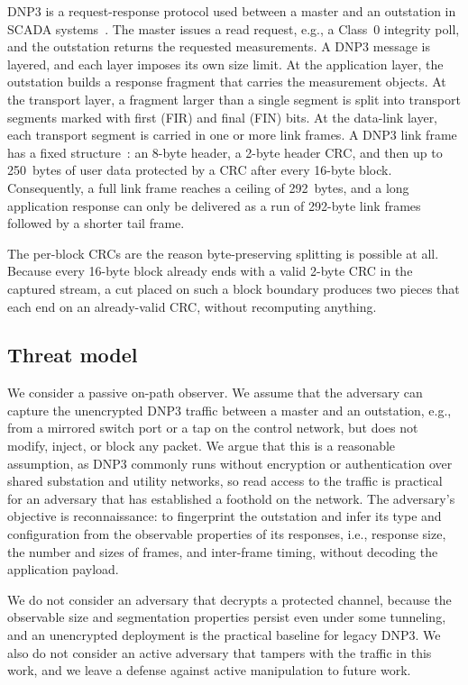 \documentclass[conference]{IEEEtran}
\begin{document}
DNP3 is a request-response protocol used between a master and an outstation in
SCADA systems~\cite{ref:dnp3}. The master issues a read request, e.g., a Class~0
integrity poll, and the outstation returns the requested measurements. A DNP3
message is layered, and each layer imposes its own size limit. At the application
layer, the outstation builds a response fragment that carries the measurement
objects. At the transport layer, a fragment larger than a single segment is split
into transport segments marked with first (FIR) and final (FIN) bits. At the
data-link layer, each transport segment is carried in one or more link frames. A
DNP3 link frame has a fixed structure~\cite{ref:dnp3}: an 8-byte header, a 2-byte
header CRC, and then up to 250~bytes of user data protected by a CRC after every
16-byte block. Consequently, a full link frame reaches a ceiling of 292~bytes,
and a long application response can only be delivered as a run of 292-byte link
frames followed by a shorter tail frame.

The per-block CRCs are the reason byte-preserving splitting is possible at all.
Because every 16-byte block already ends with a valid 2-byte CRC in the captured
stream, a cut placed on such a block boundary produces two pieces that each end
on an already-valid CRC, without recomputing anything.

\subsection{Threat model}

We consider a passive on-path observer. We assume that the adversary can capture
the unencrypted DNP3 traffic between a master and an outstation, e.g., from a
mirrored switch port or a tap on the control network, but does not modify,
inject, or block any packet. We argue that this is a reasonable assumption, as
DNP3 commonly runs without encryption or authentication over shared substation
and utility networks, so read access to the traffic is practical for an adversary
that has established a foothold on the network. The adversary's objective is
reconnaissance: to fingerprint the outstation and infer its type and
configuration from the observable properties of its responses, i.e., response
size, the number and sizes of frames, and inter-frame timing, without decoding
the application payload.

We do not consider an adversary that decrypts a protected channel, because the
observable size and segmentation properties persist even under some tunneling,
and an unencrypted deployment is the practical baseline for legacy DNP3. We also
do not consider an active adversary that tampers with the traffic in this work,
and we leave a defense against active manipulation to future work.
\end{document}

